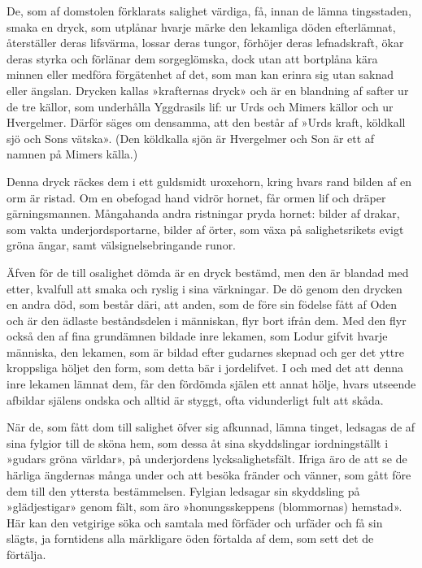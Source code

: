 De, som af domstolen förklarats salighet värdiga, få, innan de lämna
tingsstaden, smaka en dryck, som utplånar hvarje märke den lekamliga
döden efterlämnat, återställer deras lifsvärma, lossar deras tungor,
förhöjer deras lefnadskraft, ökar deras styrka och förlänar dem
sorgeglömska, dock utan att bortplåna kära minnen eller medföra
förgätenhet af det, som man kan erinra sig utan saknad eller ängslan.
Drycken kallas »krafternas dryck» och är en blandning af safter ur de
tre källor, som underhålla Yggdrasils lif: ur Urds och Mimers källor och
ur Hvergelmer. Därför säges om
densamma,
att den består af »Urds kraft, köldkall sjö och Sons vätska». (Den
köldkalla sjön är Hvergelmer och Son är ett af namnen på Mimers källa.)

Denna dryck räckes dem i ett guldsmidt uroxehorn, kring hvars rand
bilden af en orm är ristad. Om en obefogad hand vidrör hornet, får ormen
lif och dräper gärningsmannen. Mångahanda andra ristningar pryda hornet:
bilder af drakar, som vakta underjordsportarne, bilder af örter, som
växa på salighetsrikets evigt gröna ängar, samt välsignelsebringande
runor.

Äfven för de till osalighet dömda är en dryck bestämd, men den är
blandad med etter, kvalfull att smaka och ryslig i sina värkningar. De
dö genom den drycken en andra död, som består däri, att anden, som de
före sin födelse fått af Oden och är den ädlaste beståndsdelen i
människan, flyr bort ifrån dem. Med den flyr också den af fina
grundämnen bildade inre lekamen, som Lodur gifvit hvarje människa, den
lekamen, som är bildad efter gudarnes skepnad och ger det yttre
kroppsliga höljet den form, som detta bär i jordelifvet. I och med det
att denna inre lekamen lämnat dem, får den fördömda själen ett annat
hölje, hvars utseende afbildar själens ondska och alltid är styggt, ofta
vidunderligt fult att skåda.

När de, som fått dom till salighet öfver sig afkunnad, lämna tinget,
ledsagas de af sina fylgior till de sköna hem, som dessa åt sina
skyddslingar iordningställt i »gudars gröna världar», på underjordens
lycksalighetsfält. Ifriga äro de att se de härliga ängdernas många under
och att besöka fränder och vänner, som gått före dem till den yttersta
bestämmelsen. Fylgian ledsagar sin skyddsling på »glädjestigar» genom
fält, som äro »honungsskeppens (blommornas) hemstad». Här kan den
vetgirige söka och samtala med förfäder och urfäder och få sin slägts,
ja forntidens alla märkligare öden förtalda af dem, som sett det de
förtälja.

